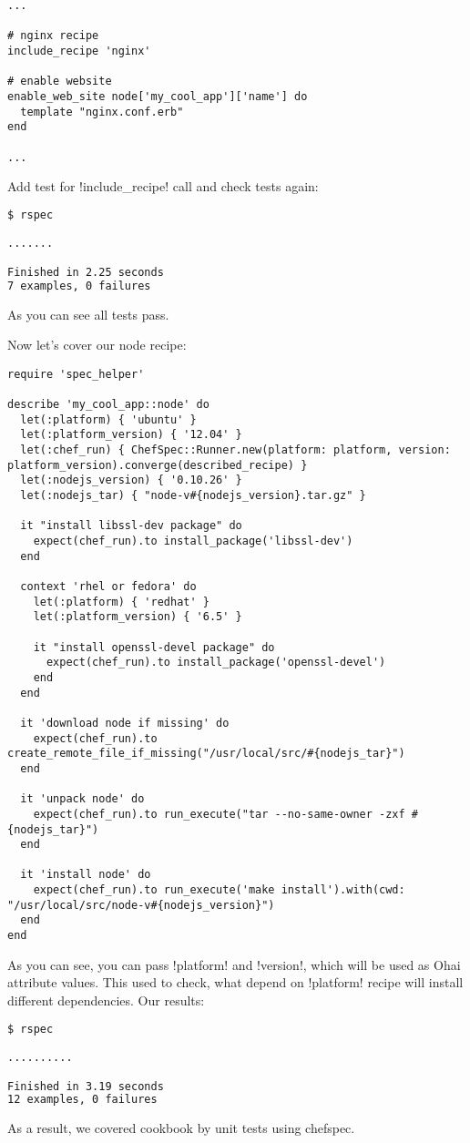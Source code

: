 \begin{lstlisting}[label=lst:testing-chefspec6,title=my-server-cloud/site-cookbooks/my\_cool\_app/recipes/default.rb]
...

# nginx recipe
include_recipe 'nginx'

# enable website
enable_web_site node['my_cool_app']['name'] do
  template "nginx.conf.erb"
end

...
\end{lstlisting}

Add test for \inline!include_recipe! call and check tests again:

\begin{lstlisting}[language=Bash,label=lst:testing-chefspec7]
$ rspec

.......

Finished in 2.25 seconds
7 examples, 0 failures
\end{lstlisting}

As you can see all tests pass.

Now let's cover our node recipe:

\begin{lstlisting}[label=lst:testing-chefspec8,title=my-server-cloud/site-cookbooks/my\_cool\_app/spec/unit/recipes/node\_spec.rb]
require 'spec_helper'

describe 'my_cool_app::node' do
  let(:platform) { 'ubuntu' }
  let(:platform_version) { '12.04' }
  let(:chef_run) { ChefSpec::Runner.new(platform: platform, version: platform_version).converge(described_recipe) }
  let(:nodejs_version) { '0.10.26' }
  let(:nodejs_tar) { "node-v#{nodejs_version}.tar.gz" }

  it "install libssl-dev package" do
    expect(chef_run).to install_package('libssl-dev')
  end

  context 'rhel or fedora' do
    let(:platform) { 'redhat' }
    let(:platform_version) { '6.5' }

    it "install openssl-devel package" do
      expect(chef_run).to install_package('openssl-devel')
    end
  end

  it 'download node if missing' do
    expect(chef_run).to create_remote_file_if_missing("/usr/local/src/#{nodejs_tar}")
  end

  it 'unpack node' do
    expect(chef_run).to run_execute("tar --no-same-owner -zxf #{nodejs_tar}")
  end

  it 'install node' do
    expect(chef_run).to run_execute('make install').with(cwd: "/usr/local/src/node-v#{nodejs_version}")
  end
end
\end{lstlisting}

As you can see, you can pass \inline!platform! and \inline!version!, which will be used as Ohai attribute values. This used to check, what depend on \inline!platform! recipe will install different dependencies. Our results:

\begin{lstlisting}[language=Bash,label=lst:testing-chefspec9]
$ rspec

..........

Finished in 3.19 seconds
12 examples, 0 failures
\end{lstlisting}

As a result, we covered cookbook by unit tests using chefspec.
